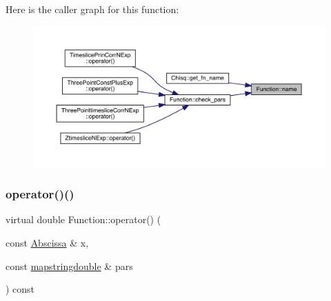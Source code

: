 Here is the caller graph for this function\+:
\nopagebreak
\begin{figure}[H]
\begin{center}
\leavevmode
\includegraphics[width=350pt]{de/d65/classFunction_ac6dc83996d6f002141a0a0f66f2c6496_icgraph}
\end{center}
\end{figure}
\mbox{\label{classFunction_a8cd7f815d5f883cc523341c53ba811d0}} 
\subsubsection{\texorpdfstring{operator()()}{operator()()}\hspace{0.1cm}{\footnotesize\ttfamily [1/2]}}
{\footnotesize\ttfamily virtual double Function\+::operator() (\begin{DoxyParamCaption}\item[{const \mbox{\hyperlink{classAbscissa}{Abscissa}} \&}]{x,  }\item[{const \mbox{\hyperlink{lib_2fitting__lib_2includes_8h_a647b481c557c7966517f753340a81d13}{mapstringdouble}} \&}]{pars }\end{DoxyParamCaption}) const\hspace{0.3cm}{\ttfamily [pure virtual]}}



